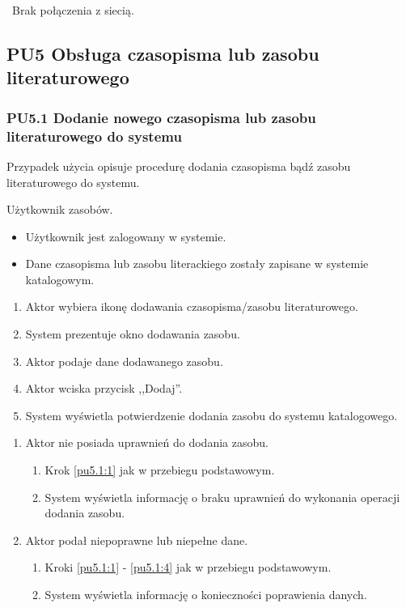 \
Brak połączenia z siecią.

\subsection{PU5 Obsługa czasopisma lub zasobu literaturowego} \label{pu5}
\subsubsection{PU5.1 Dodanie nowego czasopisma lub zasobu literaturowego do systemu}

Przypadek użycia opisuje procedurę dodania czasopisma bądź zasobu literaturowego do systemu.

Użytkownik zasobów.

\begin{itemize}
\item Użytkownik jest zalogowany w systemie.
\end{itemize}

\begin{itemize}
\item Dane czasopisma lub zasobu literackiego zostały zapisane w systemie katalogowym.
\end{itemize}

\begin{enumerate}
\item \label{pu5.1:1} Aktor wybiera ikonę dodawania czasopisma/zasobu literaturowego.
\item System prezentuje okno dodawania zasobu.
\item Aktor podaje dane dodawanego zasobu.
\item \label{pu5.1:4} Aktor wciska przycisk ,,Dodaj''.
\item System wyświetla potwierdzenie dodania zasobu do systemu katalogowego.
\end{enumerate}

\begin{enumerate}
\item Aktor nie posiada uprawnień do dodania zasobu.
	\begin{enumerate}[label*=\arabic*.]
		\item Krok \ref{pu5.1:1} jak w przebiegu podstawowym.
		\item System wyświetla informację o braku uprawnień do wykonania operacji dodania zasobu.
	\end{enumerate}
\item Aktor podał niepoprawne lub niepełne dane.
	\begin{enumerate}[label*=\arabic*.]
		\item Kroki \ref{pu5.1:1} - \ref{pu5.1:4} jak w przebiegu podstawowym.
		\item System wyświetla informację o konieczności poprawienia danych.
	\end{enumerate}
\end{enumerate}

